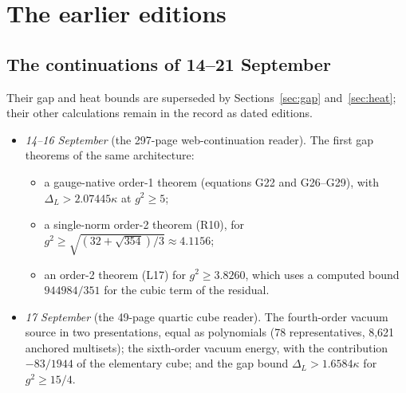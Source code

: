 \section{The earlier editions}\label{sec:earlier}

\subsection{The continuations of 14--21 September}

Their gap and heat bounds are superseded by Sections~\ref{sec:gap} and~\ref{sec:heat}; their other calculations remain in the record as dated editions.
\begin{itemize}
\item \emph{14--16 September} (the 297-page web-continuation reader). The first gap theorems of the same architecture:
\begin{itemize}
\item a gauge-native order-1 theorem (equations G22 and G26--G29), with $\Delta_L>2.07445\kappa$ at $g^2\ge5$;
\item a single-norm order-2 theorem (R10), for $g^2\ge\sqrt{(32+\sqrt{354})/3}\approx4.1156$;
\item an order-2 theorem (L17) for $g^2\ge3.8260$, which uses a computed bound $944984/351$ for the cubic term of the residual.
\end{itemize}
\item \emph{17 September} (the 49-page quartic cube reader). The fourth-order vacuum source in two presentations, equal as polynomials (78 representatives, 8{,}621 anchored multisets); the sixth-order vacuum energy, with the contribution $-83/1944$ of the elementary cube; and the gap bound $\Delta_L>1.6584\kappa$ for $g^2\ge15/4$.

\end{itemize}
